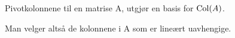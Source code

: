 Pivotkolonnene til en matrise A, utgjør en basis for $\text{Col}(A)$.

Man velger altså de kolonnene i A som er lineært uavhengige.
